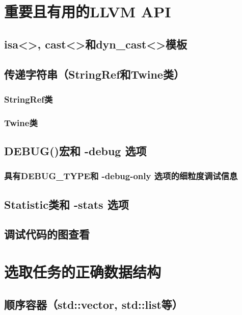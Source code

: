 \documentclass[12pt,a4paper]{article}
\begin{document}
\section{重要且有用的LLVM API}

\subsection{isa<>, cast<>和dyn\_cast<>模板}

\subsection{传递字符串（StringRef和Twine类）}

\subsubsection{StringRef类}

\subsubsection{Twine类}

\subsection{DEBUG()宏和 -debug 选项}

\subsubsection{具有DEBUG\_TYPE和 -debug-only 选项的细粒度调试信息}

\subsection{Statistic类和 -stats 选项}

\subsection{调试代码的图查看}

\section{选取任务的正确数据结构}

\subsection{顺序容器（std::vector, std::list等）}
\end{document}
